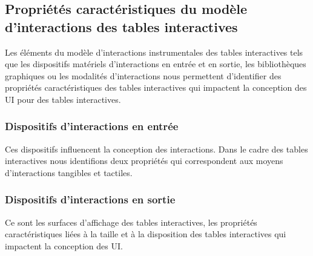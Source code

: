

\subsection{Propriétés caractéristiques du modèle d'interactions des tables interactives }
\label{sec:chap2:3:4}
Les éléments du modèle d'interactions instrumentales des tables interactives tels que les dispositifs matériels d'interactions en entrée et en sortie, les bibliothèques graphiques ou les modalités d'interactions nous permettent d'identifier des propriétés caractéristiques des tables interactives qui impactent la conception des UI pour des tables interactives. 
\subsubsection{Dispositifs d'interactions en entrée }
\label{sec:chap2:3:4:1}
Ces dispositifs influencent la conception des interactions. Dans le cadre des tables interactives nous identifions deux propriétés qui correspondent aux moyens d'interactions tangibles et tactiles.



\subsubsection{Dispositifs d'interactions en sortie }
\label{sec:chap2:3:4:2}
Ce sont les surfaces d'affichage des tables interactives, les propriétés caractéristiques liées à la taille et à la disposition des tables interactives qui impactent la conception des UI.\\

